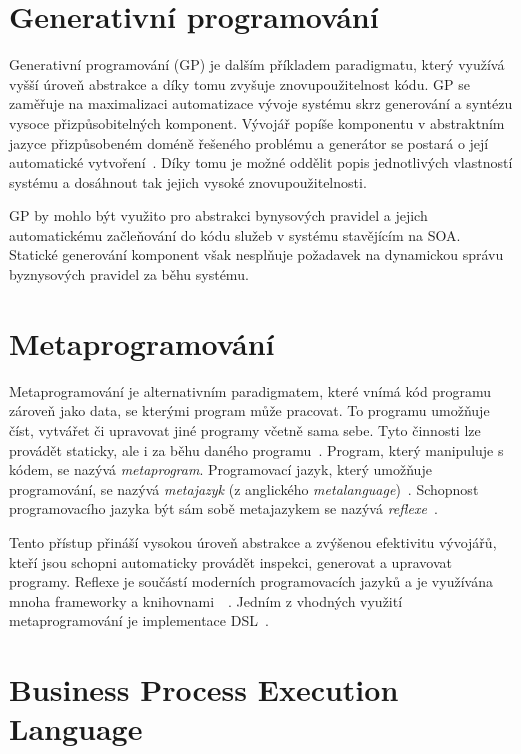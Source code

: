 \section{Generativní programování}

Generativní programování (\gls{GP}) je dalším příkladem paradigmatu, který
využívá vyšší úroveň abstrakce a díky tomu zvyšuje znovupoužitelnost
kódu. \gls{GP} se zaměřuje na maximalizaci automatizace vývoje systému
skrz generování a syntézu vysoce přizpůsobitelných komponent. Vývojář
popíše komponentu v abstraktním jazyce přizpůsobeném doméně řešeného
problému a generátor se postará o její automatické vytvoření~\cite{czarnecki2000generative}.
Díky tomu je možné oddělit popis jednotlivých vlastností systému a dosáhnout tak
jejich vysoké znovupoužitelnosti.

\gls{GP} by mohlo být využito pro abstrakci bynysových pravidel a jejich automatickému
začleňování do kódu služeb v systému stavějícím na \gls{SOA}.
Statické generování komponent však nesplňuje požadavek na dynamickou správu
byznysových pravidel za běhu systému.

\section{Metaprogramování}

Metaprogramování je alternativním paradigmatem, které vnímá kód programu
zároveň jako data, se kterými program může pracovat. To programu umožňuje
číst, vytvářet či upravovat jiné programy včetně sama sebe. Tyto činnosti
lze provádět staticky, ale i za běhu daného programu~\cite{sheard2001accomplishments}\cite{czarnecki2000generative}.
Program, který manipuluje s kódem, se nazývá \textit{metaprogram}. Programovací
jazyk, který umožňuje programování, se nazývá \textit{metajazyk} (z anglického
\textit{metalanguage})~\cite{visser2002meta}. Schopnost programovacího jazyka
být sám sobě metajazykem se nazývá \textit{reflexe}~\cite{sobel1996introduction}.

Tento přístup přináší vysokou úroveň abstrakce a zvýšenou efektivitu
vývojářů, kteří jsou schopni automaticky provádět inspekci, generovat a upravovat
programy. Reflexe je součástí moderních programovacích jazyků a je
využívána mnoha frameworky a knihovnami~\cite{vandevoorde2002c++}~\cite{forman2004java}.
Jedním z vhodných využití metaprogramování je implementace \gls{DSL}~\cite{sheard2001accomplishments}.

\section{Business Process Execution Language}

